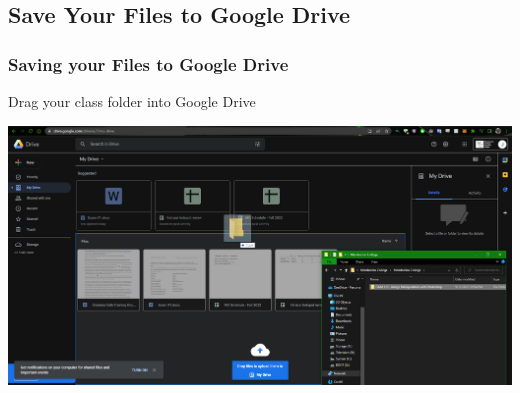 \documentclass{beamer}
\begin{document}
	\subsection{Save Your Files to Google Drive}
\begin{frame}
	\frametitle{Saving your Files to Google Drive}
	\begin{outline}
		\1 Drag your class folder into Google Drive
	\end{outline}
		\begin{center}
	\includegraphics[width = 1.0\textwidth]{images/backing up with google drive.png}
\end{center}
\end{frame}
\end{document}
